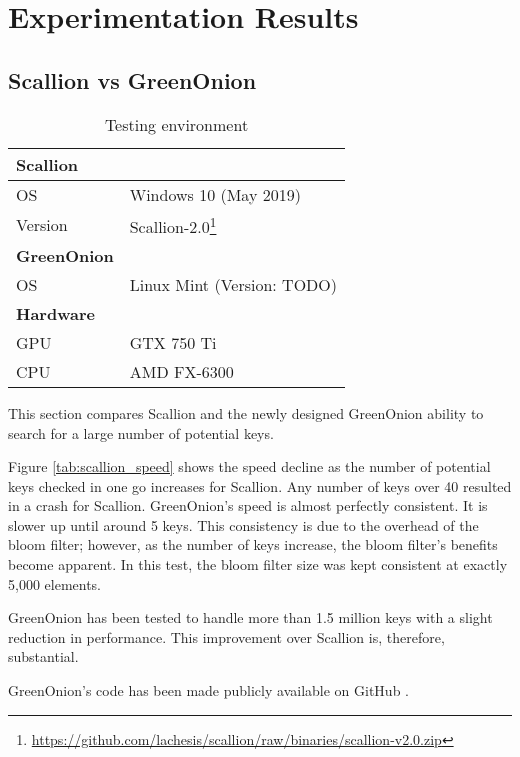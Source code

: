 \chapter{Experimentation Results}
\label{cha:Experiments}

\section{Scallion vs GreenOnion}
\label{sec:SvG}


\begin{wraptable}[11]{r}{6cm}
    \centering
    \begin{tabular}{|ll|}
        \hline
        \textbf{Scallion} & \\
        \hline
        OS & Windows 10 (May 2019) \\
        Version & Scallion-2.0\footnote{\url{https://github.com/lachesis/scallion/raw/binaries/scallion-v2.0.zip}} \\
        \hline
        \textbf{GreenOnion} & \\
        \hline
        OS & Linux Mint (Version: TODO) \\ 
        \hline
        \textbf{Hardware} & \\
        \hline
        GPU & GTX 750 Ti  \\
        CPU & AMD FX-6300 \\
        \hline
    \end{tabular}
    \caption{Testing environment}
\end{wraptable}

This section compares Scallion and the newly designed GreenOnion ability to search for a large number of potential keys.

Figure \ref{tab:scallion_speed} shows the speed decline as the number of potential keys checked in one go increases for Scallion. Any number of keys over 40 resulted in a crash for Scallion. GreenOnion's speed is almost perfectly consistent. It is slower up until  around 5 keys. This consistency is due to the overhead of the bloom filter; however, as the number of keys increase, the bloom filter's benefits become apparent. In this test, the bloom filter size was kept consistent at exactly 5,000 elements.

GreenOnion has been tested to handle more than 1.5 million keys with a slight reduction in performance. This improvement over Scallion is, therefore, substantial.

GreenOnion's code has been made publicly available on GitHub .


